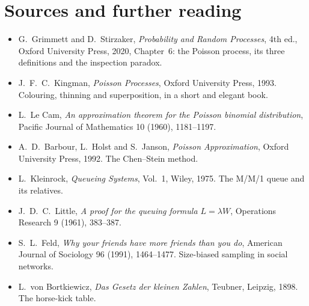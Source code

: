 \section*{Sources and further reading}

\begin{itemize}
\item G.~Grimmett and D.~Stirzaker, \emph{Probability and Random Processes}, 4th ed., Oxford University Press, 2020,
Chapter~6: the Poisson process, its three definitions and the inspection paradox.
\item J.~F.~C.~Kingman, \emph{Poisson Processes}, Oxford University Press, 1993. Colouring, thinning and superposition,
in a short and elegant book.
\item L.~Le Cam, \emph{An approximation theorem for the Poisson binomial distribution}, Pacific Journal of Mathematics
10 (1960), 1181--1197.
\item A.~D.~Barbour, L.~Holst and S.~Janson, \emph{Poisson Approximation}, Oxford University Press, 1992. The Chen--Stein
method.
\item L.~Kleinrock, \emph{Queueing Systems}, Vol.~1, Wiley, 1975. The M/M/1 queue and its relatives.
\item J.~D.~C.~Little, \emph{A proof for the queuing formula $L=\lambda W$}, Operations Research 9 (1961), 383--387.
\item S.~L.~Feld, \emph{Why your friends have more friends than you do}, American Journal of Sociology 96 (1991),
1464--1477. Size-biased sampling in social networks.
\item L.~von Bortkiewicz, \emph{Das Gesetz der kleinen Zahlen}, Teubner, Leipzig, 1898. The horse-kick table.
\end{itemize}

